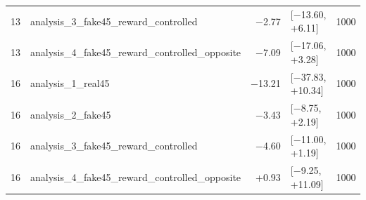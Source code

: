 \begin{table}[htbp]
\begin{tabular}{rlrlr}
    13 & analysis\_3\_fake45\_reward\_controlled & −2.77 & [−13.60, +6.11] & 1000 \\
    13 & analysis\_4\_fake45\_reward\_controlled\_opposite & −7.09 & [−17.06, +3.28] & 1000 \\
    16 & analysis\_1\_real45 & −13.21 & [−37.83, +10.34] & 1000 \\
    16 & analysis\_2\_fake45 & −3.43 & [−8.75, +2.19] & 1000 \\
    16 & analysis\_3\_fake45\_reward\_controlled & −4.60 & [−11.00, +1.19] & 1000 \\
    16 & analysis\_4\_fake45\_reward\_controlled\_opposite & +0.93 & [−9.25, +11.09] & 1000 \\
    \bottomrule
  \end{tabular}
\end{table}
